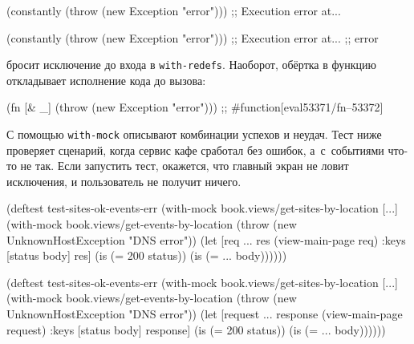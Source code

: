 \ifnarrow

\begin{english}
  \begin{clojure}
(constantly
  (throw (new Exception "error")))
;; Execution error at...
  \end{clojure}
\end{english}

\else

\begin{english}
  \begin{clojure}
(constantly (throw (new Exception "error")))
;; Execution error at...
;; error
  \end{clojure}
\end{english}

\fi


\noindent
бросит исключение до входа в \verb|with-redefs|. Наоборот, обёртка в
функцию откладывает исполнение кода до вызова:

\begin{english}
  \begin{clojure}
(fn [& _] (throw (new Exception "error")))
;; #function[eval53371/fn--53372]
  \end{clojure}
\end{english}

С помощью \verb|with-mock| описывают комбинации успехов и неудач. Тест ниже
проверяет сценарий, когда сервис кафе сработал без ошибок, а~с~событиями что-то
не так. Если запустить тест, окажется, что главный экран не ловит исключения, и
пользователь не получит ничего.

\ifnarrow

\begin{english}
  \begin{clojure/lines}
(deftest test-sites-ok-events-err
  (with-mock
    book.views/get-sites-by-location
    [...]
    (with-mock
     book.views/get-events-by-location
     (throw
      (new UnknownHostException
        "DNS error"))
     (let [req {...}
           res (view-main-page req)
           {:keys [status body]} res]
       (is (= 200 status))
       (is (= {...} body))))))
  \end{clojure/lines}
\end{english}

\else

\begin{english}
  \begin{clojure/lines}
(deftest test-sites-ok-events-err
  (with-mock book.views/get-sites-by-location [...]
    (with-mock book.views/get-events-by-location
      (throw (new UnknownHostException "DNS error"))
      (let [request {...}
            response (view-main-page request)
            {:keys [status body]} response]
        (is (= 200 status))
        (is (= {...} body))))))
  \end{clojure/lines}
\end{english}

